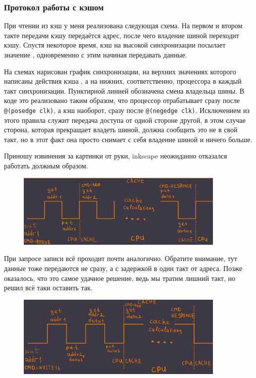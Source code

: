\documentclass[14pt, russian, onesize]{extreport}
\begin{document}
\subsubsection*{ Протокол работы с кэшом }
При чтении из кэш у меня реализована следующая схема. На первом и 
втором такте передачи кэшу передаётся адрес, после чего
владение шиной переходит кэшу. Спустя некоторое время, кэш
на высокой синхронизации посылает значение , одновременно
с этим начиная передавать данные. 

На схемах нарисован график синхронизации, на верхних
значениях которого написаны действия кэша , а на нижних, соответственно,
процессора в каждый такт синхронизации. 
Пунктирной линией обозначена смена владельца шины.
В коде это реализовано таким образом, что процессор отрабатывает
сразу после \texttt{@(posedge clk)}, а кэш наоборот,
сразу после \texttt{@(negedge clk)}. Исключением из этого
правила служит передача доступа от одной стороне другой, в этом случае
сторона, которая прекращает владеть шиной, должна сообщить это не в свой
такт, но в этот факт она просто снимает с себя владение шиной и ничего больше.

Приношу извинения за картинки от руки,
inkscape неожиданно отказался работать должным образом. 
\begin{figure}[H]
    \centering
    \includegraphics[width=0.9\textwidth]{cache_read}
    \caption{}
\end{figure}

При запросе записи всё проходит почти аналогично. Обратите внимание,
тут данные тоже передаются не сразу, а с задержкой в один такт от адреса.
Позже оказалось, что это самое удачное решение,
ведь мы тратим лишний такт, но решил всё таки оставить так.
\begin{figure}[H]
    \centering
    \includegraphics[width=0.9\textwidth]{cache_write}
    \caption{}
\end{figure}
\end{document}
